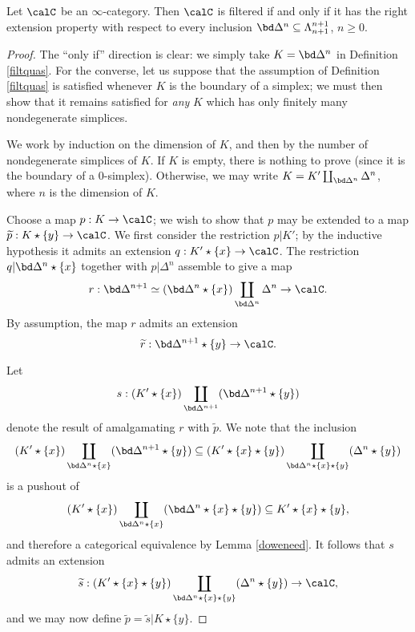 \begin{lemma}\label{goony}
Let $\calC$ be an $\infty$-category. Then $\calC$ is filtered if and only if it has the right extension
property with respect to every inclusion $\bd \Delta^n \subseteq \Lambda^{n+1}_{n+1}$, $n \geq 0$.
\end{lemma}

\begin{proof}
The ``only if'' direction is clear: we simply take $K = \bd \Delta^n$ in Definition \ref{filtquas}.
For the converse, let us suppose that the assumption of Definition \ref{filtquas} is satisfied whenever $K$ is the boundary of a simplex; we must then show that it remains satisfied for {\em any} $K$ which has only finitely many nondegenerate simplices.

We work by induction on the dimension of $K$, and then by the number of nondegenerate simplices of $K$. If $K$ is empty, there is nothing to prove (since it is the boundary of a $0$-simplex). Otherwise, we may write $K = K' \coprod_{ \bd \Delta^n } \Delta^n$, where $n$ is the dimension of $K$. 

Choose a map $p: K \rightarrow \calC$; we wish to show that $p$ may be extended to a map
$\widetilde{p}: K \star \{y\} \rightarrow \calC$. We first consider the restriction $p|K'$; by the inductive hypothesis it admits an extension $q: K' \star \{x\} \rightarrow \calC$. The
restriction $q | \bd \Delta^n \star \{x\}$ together with $p|\Delta^n$ assemble to give a map
$$ r: \bd \Delta^{n+1} \simeq ( \bd \Delta^n \star \{x\} ) \coprod_{ \bd \Delta^n } \Delta^n \rightarrow
\calC.$$
By assumption, the map $r$ admits an extension
$$\widetilde{r}: \bd \Delta^{n+1} \star \{y\} \rightarrow \calC.$$

Let $$s: ( K' \star \{x\} ) \coprod_{ \bd \Delta^{n+1}  } ( \bd \Delta^{n+1} \star \{y\})$$ denote the result of amalgamating $r$ with $\widetilde{p}$. We note that the inclusion
$$ (K' \star \{x\} ) \coprod_{ \bd \Delta^n \star \{x\} } ( \bd \Delta^{n+1} \star \{y\} )
\subseteq (K' \star \{x\} \star \{y\}) \coprod_{ \bd \Delta^n \star \{x\} \star \{y\} } ( \Delta^n \star \{y\} )$$
is a pushout of
$$ (K' \star \{x\}) \coprod_{ \bd \Delta^n \star \{x\} } (\bd \Delta^n \star \{x\} \star \{y\} )
\subseteq K' \star \{x\} \star \{y\},$$ and therefore a categorical equivalence by Lemma \ref{doweneed}. It follows that $s$ admits an extension
$$ \widetilde{s}: (K' \star \{x\} \star \{y\}) \coprod_{ \bd \Delta^n \star \{x\} \star \{y\} } ( \Delta^n \star \{y\} ) \rightarrow \calC, $$ and we may now define $\widetilde{p} = \widetilde{s} | K \star \{y\}$. 
\end{proof}

